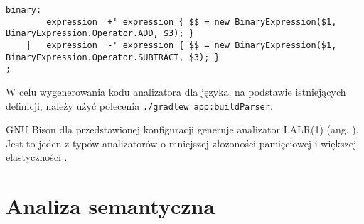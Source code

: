 \begin{lstlisting}
binary:
        expression '+' expression { $$ = new BinaryExpression($1, BinaryExpression.Operator.ADD, $3); }
    |   expression '-' expression { $$ = new BinaryExpression($1, BinaryExpression.Operator.SUBTRACT, $3); }
;
\end{lstlisting}

W celu wygenerowania kodu analizatora dla języka, na podstawie istniejących definicji, należy użyć polecenia \lstinline|./gradlew app:buildParser|.

GNU Bison dla przedstawionej konfiguracji generuje analizator LALR(1) (ang. ). Jest to jeden z typów analizatorów o mniejszej złożoności pamięciowej i większej elastyczności  \cite{baqaiComparisonParsingTechniques}.

\section{Analiza semantyczna}

